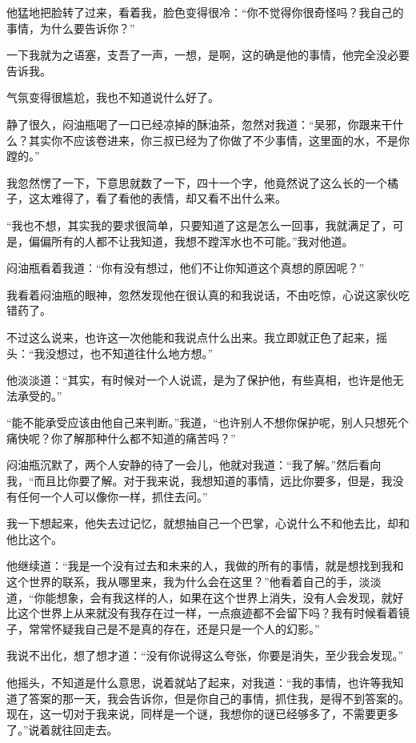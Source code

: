 他猛地把脸转了过来，看着我，脸色变得很冷：“你不觉得你很奇怪吗？我自己的事情，为什么要告诉你？”

一下我就为之语塞，支吾了一声，一想，是啊，这的确是他的事情，他完全没必要告诉我。

气氛变得很尴尬，我也不知道说什么好了。

静了很久，闷油瓶喝了一口已经凉掉的酥油茶，忽然对我道：“吴邪，你跟来干什么？其实你不应该卷进来，你三叔已经为了你做了不少事情，这里面的水，不是你蹚的。”

我忽然愣了一下，下意思就数了一下，四十一个字，他竟然说了这么长的一个橘子，这太难得了，看了看他的表情，却又看不出什么来。

“我也不想，其实我的要求很简单，只要知道了这是怎么一回事，我就满足了，可是，偏偏所有的人都不让我知道，我想不蹚浑水也不可能。”我对他道。

闷油瓶看着我道：“你有没有想过，他们不让你知道这个真想的原因呢？”

我看着闷油瓶的眼神，忽然发现他在很认真的和我说话，不由吃惊，心说这家伙吃错药了。

不过这么说来，也许这一次他能和我说点什么出来。我立即就正色了起来，摇头：“我没想过，也不知道往什么地方想。”

他淡淡道：“其实，有时候对一个人说谎，是为了保护他，有些真相，也许是他无法承受的。”

“能不能承受应该由他自己来判断。”我道，“也许别人不想你保护呢，别人只想死个痛快呢？你了解那种什么都不知道的痛苦吗？”

闷油瓶沉默了，两个人安静的待了一会儿，他就对我道：“我了解。”然后看向我，“而且比你要了解。对于我来说，我想知道的事情，远比你要多，但是，我没有任何一个人可以像你一样，抓住去问。”

我一下想起来，他失去过记忆，就想抽自己一个巴掌，心说什么不和他去比，却和他比这个。

他继续道：“我是一个没有过去和未来的人，我做的所有的事情，就是想找到我和这个世界的联系，我从哪里来，我为什么会在这里？”他看着自己的手，淡淡道，“你能想象，会有我这样的人，如果在这个世界上消失，没有人会发现，就好比这个世界上从来就没有我存在过一样，一点痕迹都不会留下吗？我有时候看着镜子，常常怀疑我自己是不是真的存在，还是只是一个人的幻影。”

我说不出化，想了想才道：“没有你说得这么夸张，你要是消失，至少我会发现。”

他摇头，不知道是什么意思，说着就站了起来，对我道：“我的事情，也许等我知道了答案的那一天，我会告诉你，但是你自己的事情，抓住我，是得不到答案的。现在，这一切对于我来说，同样是一个谜，我想你的谜已经够多了，不需要更多了。”说着就往回走去。

